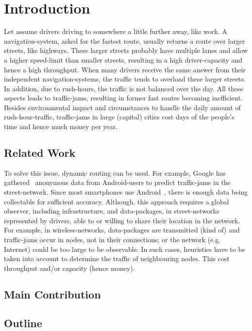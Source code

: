 \chapter{Introduction}
\label{chap:introduction}

Let assume drivers driving to somewhere a little further away, like work.
A navigation-system, asked for the fastest route, usually returns a route over larger streets, like highways.
These larger streets probably have multiple lanes and allow a higher speed-limit than smaller streets, resulting in a high driver-capacity and hence a high throughput.
When many drivers receive the same answer from their independent navigation-systems, the traffic tends to overload these larger streets.
In addition, due to rush-hours, the traffic is not balanced over the day.
All these aspects leads to traffic-jams, resulting in former fast routes becoming inefficient.
Besides environmental impact and circumstances to handle the daily amount of rush-hour-traffic, traffic-jams in large (capital) cities cost days of the people's time and hence much money per year.~\cite{inrix:traffic-cost}

    \section{Related Work}

    To solve this issue, dynamic routing can be used.
    For example, Google has gathered~\cite{barth:google-traffic} anonymous data from Android-users to predict traffic-jams in the street-network.
    Since most smartphones use Android~\cite{kantar:android-vs-ios}, there is enough data being collectable for sufficient accuracy.
    Although, this approach requires a global observer, including infrastructure, and data-packages, in street-networks represented by drivers, able to or willing to share their location in the network.
    For example, in wireless-networks, data-packages are transmitted (kind of) and traffic-jams occur in nodes, not in their connections; or the network (e.g. Internet) could be too large to be observable.
    In such cases, heuristics have to be taken into account to determine the traffic of neighbouring nodes.
    This cost throughput and/or capacity (hence money).


    \section{Main Contribution}


    \section{Outline}

